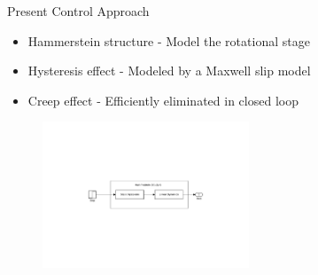 \documentclass[10pt]{beamer}
\begin{document}
\begin{frame}{Present Control Approach}
  \begin{itemize}
    \item \alert{Hammerstein structure} - Model the rotational stage
    \item \alert{Hysteresis effect} - Modeled by a Maxwell slip model
    \item \alert{Creep effect} - Efficiently eliminated in closed loop
  \end{itemize}

  \begin{figure}[h]
    \centering %
    \includegraphics[width=0.55\textwidth, trim=8cm 8cm 7.73cm 8cm, clip=true]{../fig/matlab/hammerstein}
  \end{figure}
  \vspace{-1cm}


\end{frame}
\end{document}
